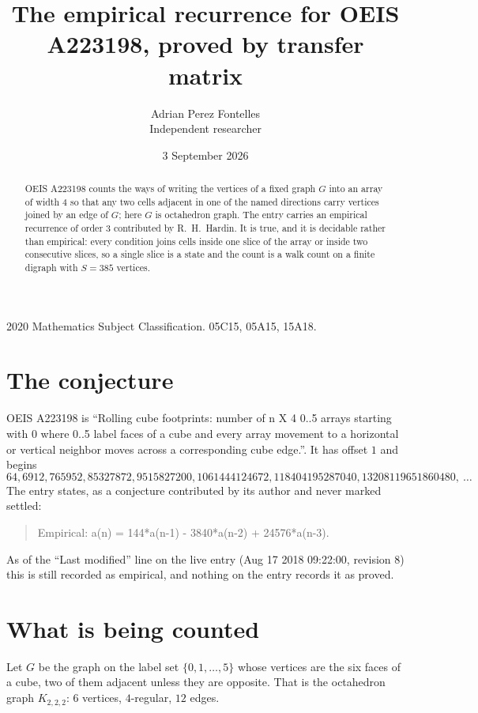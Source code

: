 \documentclass[11pt,a4paper]{article}
\title{The empirical recurrence for OEIS A223198, proved by transfer matrix}
\author{Adrian Perez Fontelles\\ \small Independent researcher}
\date{3 September 2026}
\theoremstyle{plain}
\theoremstyle{definition}
\begin{document}
\maketitle

\begin{abstract}
OEIS A223198 counts the ways of writing the vertices of a fixed graph $G$ into an array of width
$4$ so that any two cells adjacent in one of the named directions carry vertices joined by an
edge of $G$; here $G$ is octahedron graph. The entry carries an empirical recurrence of order $3$
contributed by R.~H.~Hardin. It is true, and it is decidable rather than empirical: every
condition joins cells inside one slice of the array or inside two consecutive slices, so a
single slice is a state and the count is a walk count on a finite digraph with $S=385$ vertices.
\end{abstract}

\noindent\small 2020 Mathematics Subject Classification. 05C15, 05A15, 15A18.\normalsize

\section{The conjecture}

OEIS A223198 is ``Rolling cube footprints: number of n X 4 0..5 arrays starting with 0 where 0..5 label faces of a cube and every array movement to a horizontal or vertical neighbor moves across a corresponding cube edge.''. It has offset $1$ and begins
\[
64, 6912, 765952, 85327872, 9515827200, 1061444124672, 118404195287040, 13208119651860480,\ \dots
\]
The entry states, as a conjecture contributed by its author and never marked settled:
\begin{quote}
Empirical: a(n) = 144*a(n-1) - 3840*a(n-2) + 24576*a(n-3).
\end{quote}
As of the ``Last modified'' line on the live entry (Aug 17 2018 09:22:00, revision 8) this is still
recorded as empirical, and nothing on the entry records it as proved.

\section{What is being counted}

Let $G$ be the graph on the label set $\{0,1,\dots,5\}$ whose vertices are the six faces of a cube, two of them adjacent unless they are opposite. That is the octahedron graph $K_{2,2,2}$: $6$ vertices, $4$-regular, $12$ edges.
\end{document}
